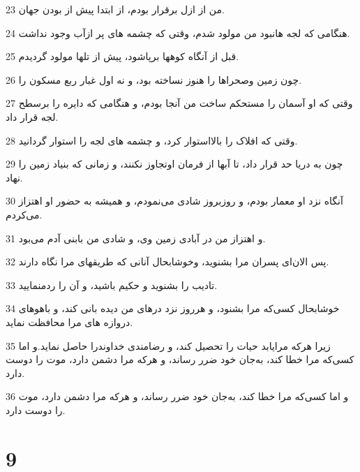 \par 23 من از ازل برقرار بودم، از ابتدا پیش از بودن جهان.
\par 24 هنگامی که لجه هانبود من مولود شدم، وقتی که چشمه های پر ازآب وجود نداشت.
\par 25 قبل از آنگاه کوهها برپاشود، پیش از تلها مولود گردیدم.
\par 26 چون زمین وصحراها را هنوز نساخته بود، و نه اول غبار ربع مسکون را.
\par 27 وقتی که او آسمان را مستحکم ساخت من آنجا بودم، و هنگامی که دایره را برسطح لجه قرار داد.
\par 28 وقتی که افلاک را بالااستوار کرد، و چشمه های لجه را استوار گردانید.
\par 29 چون به دریا حد قرار داد، تا آبها از فرمان اوتجاوز نکنند، و زمانی که بنیاد زمین را نهاد.
\par 30 آنگاه نزد او معمار بودم، و روزبروز شادی می‌نمودم، و همیشه به حضور او اهتزاز می‌کردم.
\par 31 و اهتزاز من در آبادی زمین وی، و شادی من بابنی آدم می‌بود.
\par 32 پس الان‌ای پسران مرا بشنوید، وخوشابحال آنانی که طریقهای مرا نگاه دارند.
\par 33 تادیب را بشنوید و حکیم باشید، و آن را ردمنمایید.
\par 34 خوشابحال کسی‌که مرا بشنود، و هرروز نزد درهای من دیده بانی کند، و باهوهای دروازه های مرا محافظت نماید.
\par 35 زیرا هر‌که مرایابد حیات را تحصیل کند، و رضامندی خداوندرا حاصل نماید.و اما کسی‌که مرا خطا کند، به‌جان خود ضرر رساند، و هر‌که مرا دشمن دارد، موت را دوست دارد.
\par 36 و اما کسی‌که مرا خطا کند، به‌جان خود ضرر رساند، و هر‌که مرا دشمن دارد، موت را دوست دارد.
 
\chapter{9}

